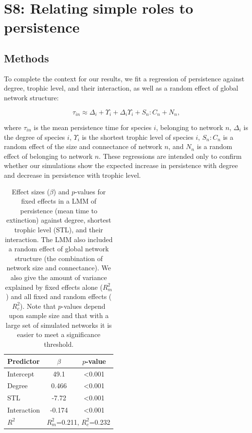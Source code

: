 \documentclass[12pt]{article}
\begin{document}
\clearpage


\section*{S8: Relating simple roles to persistence}

	\subsection*{Methods}

            To complete the context for our results, we fit a regression of persistence against degree, trophic level, and their interaction, as well as a random effect of global network structure:
            
            \begin{equation}
                \tau_{in} \approx \Delta_{i} + \Upsilon_{i} + \Delta_{i}\Upsilon_{i} + S_{n}:C_{n} + N_n ,
                \label{eq:persistence_degTL}
            \end{equation}
            
            \noindent where $\tau_{in}$ is the mean persistence time for species $i$, belonging to network $n$, $\Delta_i$ is the degree of species $i$, $\Upsilon_i$ is the shortest trophic level of species $i$, $S_{n}:C_{n}$ is a random effect of the size and connectance of network $n$, and $N_n$ is a random effect of belonging to network $n$.
            These regressions are intended only to confirm whether our simulations show the expected increase in persistence with degree and decrease in persistence with trophic level.


		\begin{table}[hb!]
			\caption{Effect sizes ($\beta$) and $p$-values for fixed effects in a LMM of persistence (mean time to extinction) against degree, shortest trophic level (STL), and their interaction. The LMM also included a random effect of global network structure (the combination of network size and connectance). We also give the amount of variance explained by fixed effects alone ($R^2_m$) and all fixed and random effects ($R^2_c$). Note that $p$-values depend upon sample size and that with a large set of simulated networks it is easier to meet a significance threshold.}
			\label{tab:per_degTL}
			\begin{tabular}{l | c c }
			Predictor & $\beta$ & $p$-value \\
			\hline
			Intercept & 49.1 & \textless0.001 \\
			Degree & 0.466 & \textless0.001 \\
			STL & -7.72 & \textless0.001 \\
			Interaction & -0.174 & \textless0.001 \\
			\hline
			$R^2$ & \multicolumn{2}{|c}{$R^2_m$=0.211, $R^2_c$=0.232} \\
			\end{tabular}
			\end{table}
\end{document}
